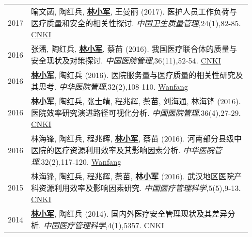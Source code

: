 \documentclass{resume}
\begin{document}
\begin{longtable}{r p{14cm}}
2017 & 喻文菡, 陶红兵, \underline{\textbf{林小军}}, 王曼丽 (2017). 医护人员工作负荷与医疗质量和安全的相关性探讨. \emph{中国卫生质量管理},24(1),82-85. \href{http://kns.cnki.net/KCMS/detail/detail.aspx?dbcode=CJFQ&dbname=CJFDLAST2017&filename=WSJG201701013&v=MDI5NThSOGVYMUx1eFlTN0RoMVQzcVRyV00xRnJDVVJMS2VadVp0RmlEbVY3M09NajdCYWJHNEg5Yk1ybzlFWjQ=}{CNKI}\\[5pt]

2016 & 张潘, 陶红兵,  \underline{\textbf{林小军}}, 蔡苗 (2016). 我国医疗联合体的质量与安全现状及对策探讨. \emph{中国医院管理},36(11),52-54. \href{http://kns.cnki.net/KCMS/detail/detail.aspx?dbcode=CJFQ&dbname=CJFDLAST2016&filename=YYGL201611027&v=MjM5Mjl1WnNGaXZtVTcvS1BEVE1Zckc0SDlmTnJvOUhZNFI4ZVgxTHV4WVM3RGgxVDNxVHJXTTFGckNVUkxLZVo=}{CNKI}\\[5pt]

2016 & \underline{\textbf{林小军}}, 陶红兵 (2016). 医院服务量与医疗质量的相关性研究及其思考. \emph{中华医院管理},32(2),108-110. \href{http://www.wanfangdata.com.cn/details/detail.do?_type=perio&id=zhyygl201602010}{Wanfang}\\[5pt]

2016 & \underline{\textbf{林小军}}, 陶红兵, 张士靖, 程兆辉, 蔡苗, 刘海通, 林海锋 (2016). 医院效率研究演进路径可视化分析. \emph{中国医院管理},36(4),27-29. \href{http://kns.cnki.net/KCMS/detail/detail.aspx?dbcode=CJFQ&dbname=CJFDLAST2016&filename=YYGL201604015&v=MjM5ODRSTEtlWnVadEZpRG5VNy9MUERUTVlyRzRIOWZNcTQ5RVlZUjhlWDFMdXhZUzdEaDFUM3FUcldNMUZyQ1U=}{CNKI}\\[5pt]

2016 & 林海锋, 陶红兵, 程兆辉, \underline{\textbf{林小军}}, 蔡苗 (2016). 河南部分县级中医院的医疗资源利用效率及其影响因素分析. \emph{中华医院管理},32(2),117-120. \href{http://www.wanfangdata.com.cn/details/detail.do?_type=perio&id=zhyygl201602013}{Wanfang}\\[5pt]

2015 & 林海锋, 陶红兵, 程兆辉, 蔡苗, \underline{\textbf{林小军}} (2016). 武汉地区医院产科资源利用效率及影响因素研究. \emph{中国医疗管理科学},5(5),9-13. \href{http://kns.cnki.net/KCMS/detail/detail.aspx?dbcode=CJFQ&dbname=CJFDLAST2015&filename=YLGL201505004&v=MjkxODIxTHV4WVM3RGgxVDNxVHJXTTFGckNVUkxLZVp1WnNGaXZtVkx2QVBDSE1Zckc0SDlUTXFvOUZZSVI4ZVg=}{CNKI}\\[5pt]

2014 & \underline{\textbf{林小军}}, 陶红兵 (2014). 国内外医疗安全管理现状及其差异分析. \emph{中国医疗管理科学},4(1),5357. \href{http://kns.cnki.net/KCMS/detail/detail.aspx?dbcode=CJFQ&dbname=CJFD2014&filename=YLGL201401019&v=MjQzMzVUcldNMUZyQ1VSTEtlWnVadEZpRG5WNy9JUENITVlyRzRIOVhNcm85RWJZUjhlWDFMdXhZUzdEaDFUM3E=}{CNKI}\\[5pt]


\end{longtable}
\end{document}
